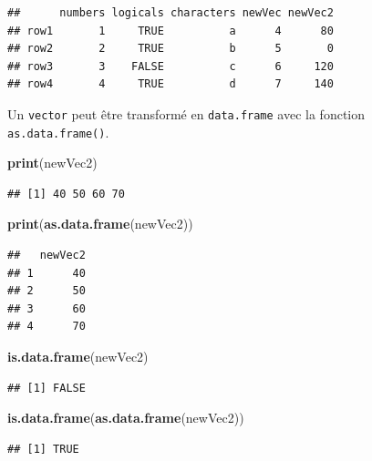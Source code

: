\documentclass[
]{book}
\newenvironment{Shaded}{\begin{snugshade}}{\end{snugshade}}
\newcommand{\KeywordTok}[1]{\textcolor[rgb]{0.13,0.29,0.53}{\textbf{#1}}}
\newcommand{\NormalTok}[1]{#1}
\begin{document}
\begin{verbatim}
##      numbers logicals characters newVec newVec2
## row1       1     TRUE          a      4      80
## row2       2     TRUE          b      5       0
## row3       3    FALSE          c      6     120
## row4       4     TRUE          d      7     140
\end{verbatim}

Un \texttt{vector} peut être transformé en \texttt{data.frame} avec la fonction \texttt{as.data.frame()}.

\begin{Shaded}
\begin{Highlighting}[]
\KeywordTok{print}\NormalTok{(newVec2)}
\end{Highlighting}
\end{Shaded}

\begin{verbatim}
## [1] 40 50 60 70
\end{verbatim}

\begin{Shaded}
\begin{Highlighting}[]
\KeywordTok{print}\NormalTok{(}\KeywordTok{as.data.frame}\NormalTok{(newVec2))}
\end{Highlighting}
\end{Shaded}

\begin{verbatim}
##   newVec2
## 1      40
## 2      50
## 3      60
## 4      70
\end{verbatim}

\begin{Shaded}
\begin{Highlighting}[]
\KeywordTok{is.data.frame}\NormalTok{(newVec2)}
\end{Highlighting}
\end{Shaded}

\begin{verbatim}
## [1] FALSE
\end{verbatim}

\begin{Shaded}
\begin{Highlighting}[]
\KeywordTok{is.data.frame}\NormalTok{(}\KeywordTok{as.data.frame}\NormalTok{(newVec2))}
\end{Highlighting}
\end{Shaded}

\begin{verbatim}
## [1] TRUE
\end{verbatim}
\end{document}
